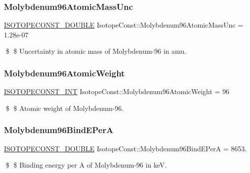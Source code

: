 \subsubsection{\texorpdfstring{Molybdenum96\+Atomic\+Mass\+Unc}{Molybdenum96AtomicMassUnc}}
{\footnotesize\ttfamily \mbox{\hyperlink{group___isotope_const-_macros_ga8f45a7272ce02c0b4c65c44636ed719a}{I\+S\+O\+T\+O\+P\+E\+C\+O\+N\+S\+T\+\_\+\+D\+O\+U\+B\+LE}} Isotope\+Const\+::\+Molybdenum96\+Atomic\+Mass\+Unc = 1.\+28e-\/07}

\$ \$ Uncertainty in atomic mass of Molybdenum-\/96 in amu. \mbox{\label{group___isotope_const-_molybdenum-_mo96_ga04c3b8ab5c7598923716bb57c4578db5}} 
\subsubsection{\texorpdfstring{Molybdenum96\+Atomic\+Weight}{Molybdenum96AtomicWeight}}
{\footnotesize\ttfamily \mbox{\hyperlink{group___isotope_const-_macros_ga5f18360b3e99483a35c32d789e62621c}{I\+S\+O\+T\+O\+P\+E\+C\+O\+N\+S\+T\+\_\+\+I\+NT}} Isotope\+Const\+::\+Molybdenum96\+Atomic\+Weight = 96}

\$ \$ Atomic weight of Molybdenum-\/96. \mbox{\label{group___isotope_const-_molybdenum-_mo96_ga4fc65b803b1ee231c01532a3db3119bf}} 
\subsubsection{\texorpdfstring{Molybdenum96\+Bind\+E\+PerA}{Molybdenum96BindEPerA}}
{\footnotesize\ttfamily \mbox{\hyperlink{group___isotope_const-_macros_ga8f45a7272ce02c0b4c65c44636ed719a}{I\+S\+O\+T\+O\+P\+E\+C\+O\+N\+S\+T\+\_\+\+D\+O\+U\+B\+LE}} Isotope\+Const\+::\+Molybdenum96\+Bind\+E\+PerA = 8653.}

\$ \$ Binding energy per A of Molybdenum-\/96 in keV. \mbox{\label{group___isotope_const-_molybdenum-_mo96_ga56c93890aacb5bba50c4d33c8536c2d3}} 
